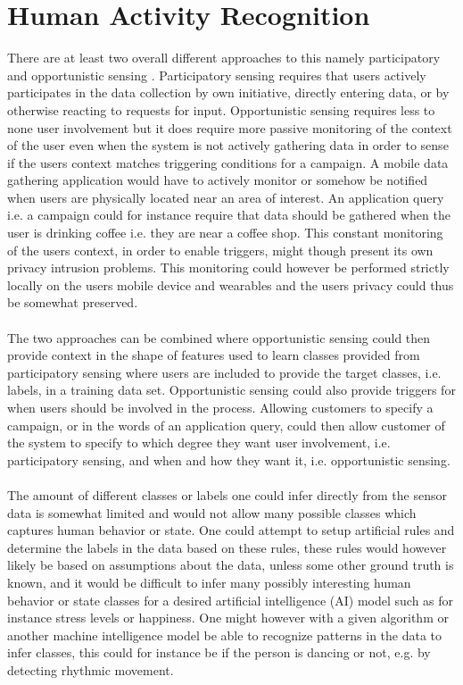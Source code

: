 
\section{Human Activity Recognition}
\label{sec:human_activity_recognition}


There are at least two overall different approaches to this namely participatory and opportunistic sensing \parencite{opp_or_par} \parencite{har_wearables}. Participatory sensing requires that users actively participates in the data collection by own initiative, directly entering data, or by otherwise reacting to requests for input. Opportunistic sensing requires less to none user involvement but it does require more passive monitoring of the context of the user even when the system is not actively gathering data in order to sense if the users context matches triggering conditions for a campaign. A mobile data gathering application would have to actively monitor or somehow be notified when users are physically located near an area of interest. An application query i.e. a campaign could for instance require that data should be gathered when the user is drinking coffee i.e. they are near a coffee shop. This constant monitoring of the users context, in order to enable triggers, might though present its own privacy intrusion problems. This monitoring could however be performed strictly locally on the users mobile device and wearables and the users privacy could thus be somewhat preserved.
\\\\
The two approaches can be combined where opportunistic sensing could then provide context in the shape of features used to learn classes provided from participatory sensing where users are included to provide the target classes, i.e. labels, in a training data set. Opportunistic sensing could also provide triggers for when users should be involved in the process. Allowing customers to specify a campaign, or in the words of \parencite{opp_or_par} an application query, could then allow customer of the system to specify to which degree they want user involvement, i.e. participatory sensing, and when and how they want it, i.e. opportunistic sensing.
\\\\
The amount of different classes or labels one could infer directly from the sensor data is somewhat limited and would not allow many possible classes which captures human behavior or state. One could attempt to setup artificial rules and determine the labels in the data based on these rules, these rules would however likely be based on assumptions about the data, unless some other ground truth is known, and it would be difficult to infer many possibly interesting human behavior or state classes for a desired artificial intelligence (AI) model such as for instance stress levels or happiness. One might however with a given algorithm or another machine intelligence model be able to recognize patterns in the data to infer classes, this could for instance be if the person is dancing or not, e.g. by detecting rhythmic movement.    
